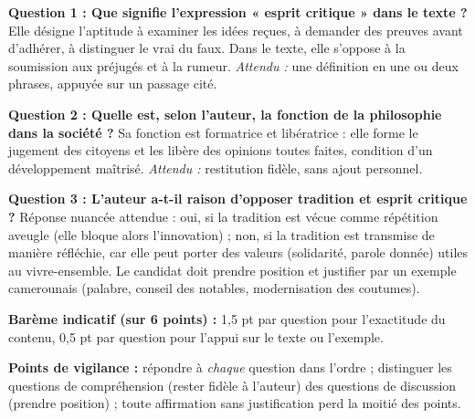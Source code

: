 \documentclass[11pt]{article}
\begin{document}
\begin{corrige}
\textbf{Question 1 : Que signifie l'expression « esprit critique » dans le texte ?} Elle désigne l'aptitude à examiner les idées reçues, à demander des preuves avant d'adhérer, à distinguer le vrai du faux. Dans le texte, elle s'oppose à la soumission aux préjugés et à la rumeur. \emph{Attendu :} une définition en une ou deux phrases, appuyée sur un passage cité.

\textbf{Question 2 : Quelle est, selon l'auteur, la fonction de la philosophie dans la société ?} Sa fonction est formatrice et libératrice : elle forme le jugement des citoyens et les libère des opinions toutes faites, condition d'un développement maîtrisé. \emph{Attendu :} restitution fidèle, sans ajout personnel.

\textbf{Question 3 : L'auteur a-t-il raison d'opposer tradition et esprit critique ?} Réponse nuancée attendue : oui, si la tradition est vécue comme répétition aveugle (elle bloque alors l'innovation) ; non, si la tradition est transmise de manière réfléchie, car elle peut porter des valeurs (solidarité, parole donnée) utiles au vivre-ensemble. Le candidat doit prendre position et justifier par un exemple camerounais (palabre, conseil des notables, modernisation des coutumes).

\textbf{Barème indicatif (sur 6 points) :} 1,5 pt par question pour l'exactitude du contenu, 0,5 pt par question pour l'appui sur le texte ou l'exemple.

\textbf{Points de vigilance :} répondre à \emph{chaque} question dans l'ordre ; distinguer les questions de compréhension (rester fidèle à l'auteur) des questions de discussion (prendre position) ; toute affirmation sans justification perd la moitié des points.
\end{corrige}
\end{document}
